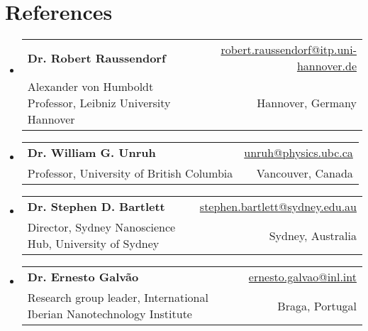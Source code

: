 \documentclass[letterpaper,11pt]{article}
\makeatletter
\newcommand{\ReferencesItem}[4]{
	\item{\vspace{-1pt}
		\begin{tabular*}{0.97\textwidth}{l@{\extracolsep{\fill}}r}
			\textbf{#1} & {#2}\\
			{#3} & {#4}
		\end{tabular*}
		\vspace{-5pt}
	}
}
\makeatother
\begin{document}
\section*{References}
\begin{itemize}[leftmargin=*]
	\ReferencesItem{Dr. Robert Raussendorf}{\href{mailto:robert.raussendorf@itp.uni-hannover.de}{robert.raussendorf@itp.uni-hannover.de}}{Alexander von Humboldt Professor, Leibniz University Hannover}{Hannover, Germany}
	
	\ReferencesItem{Dr. William G. Unruh}{\href{mailto:unruh@physics.ubc.ca}{unruh@physics.ubc.ca}}{Professor, University of British Columbia}{Vancouver, Canada}
	
	\ReferencesItem{Dr. Stephen D. Bartlett}{\href{mailto:stephen.bartlett@sydney.edu.au}{stephen.bartlett@sydney.edu.au}}{Director, Sydney Nanoscience Hub, University of Sydney}{Sydney, Australia}
	
	\ReferencesItem{Dr. Ernesto Galv\~ao}{\href{mailto:ernesto.galvao@inl.int}{ernesto.galvao@inl.int}}{Research group leader, International Iberian Nanotechnology Institute}{Braga, Portugal}
	
	
\end{itemize}
\end{document}
